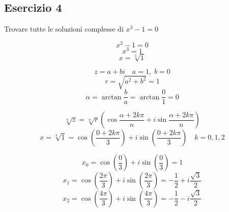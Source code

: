 \documentclass[a4paper]{article}
\theoremstyle{break}
\theoremstyle{break}
\theoremstyle{break}
\theoremstyle{break}
\begin{document}
\subsection{Esercizio 4}
Trovare tutte le soluzioni complesse di \( x^3 - 1 = 0 \)

\[
	x^3 - 1 = 0
\]
\[
	x^3 = 1
\]
\[
	x = \sqrt[3]{1}
\]

\[
	z = a + bi \quad a = 1,\; b = 0
\]
\[
	r = \sqrt{a^2 + b^2} = 1
\]
\[
	\alpha = \arctan{\frac{b}{a}} = \arctan{\frac{0}{1}} = 0
\]

\vspace{1em}
\[
	\sqrt[n]{z} = \sqrt[n]{r} \left( \cos{\frac{\alpha + 2k\pi}{n}} + i \sin{\frac{\alpha + 2k\pi}{n}} \right)
\]
\[
	x = \sqrt[3]{1} = \cos\left(\frac{0 + 2k\pi}{3}\right) + i \sin\left(\frac{0 + 2k\pi}{3}\right) \quad k = 0,1,2
\]

\vspace{1em}
\[
	x_0 = \cos\left(\frac{0}{3}\right) + i \sin\left(\frac{0}{3}\right) = 1
\]
\[
	x_1 = \cos\left(\frac{2\pi}{3}\right) + i \sin\left(\frac{2\pi}{3}\right) = -\frac{1}{2} + i \frac{\sqrt{3}}{2}
\]
\[
	x_2 = \cos\left(\frac{4\pi}{3}\right) + i \sin\left(\frac{4\pi}{3}\right) = -\frac{1}{2} - i \frac{\sqrt{3}}{2}
\]
\end{document}
